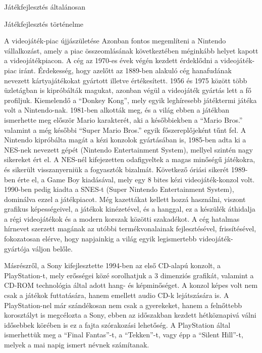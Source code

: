 \begin{MyChapter}{Játékfejlesztés általánosan}
\begin{MySection}{Játékfejlesztés történelme}
		\begin{MySubSection}{A videojáték-piac újjászületése}
			Azonban fontos megemlíteni a Nintendo vállalkozást, amely a piac összeomlásának következtében méginkább helyet kapott a videojátékpiacon. A cég az 1970-es évek végén kezdett érdeklődni a videojáték-piac iránt. Érdekesség, hogy azelőtt az 1889-ben alakuló cég hanafudának nevezett kártyajátékokat gyártott illetve értékesített. 1956 és 1975 között több üzletágban is kipróbálták magukat, azonban végül a videojáték gyártás lett a fő profiljuk. Kiemelendő a ``Donkey Kong'', mely egyik leghíresebb játéktermi játéka volt a Nintendo-nak. 1981-ben alkották meg, és a világ ebben a játékban ismerhette meg először Mario karakterét, aki a későbbiekben a ``Mario Bros.'' valamint a még későbbi ``Super Mario Bros.'' egyik főszereplőjeként tűnt fel. A Nintendo kipróbálta magát a kézi konzolok gyártásában is, 1985-ben adta ki a NES-nek nevezett gépét (Nintendo Entertainment System), mellyel szintén nagy sikereket ért el. A NES-nél kifejezetten odafigyeltek a magas minőségű játékokra, és sikerült visszanyerniük a fogyasztók bizalmát. Következő óriási sikerét 1989-ben érte el, a Game Boy kiadásával, mely egy 8 bites kézi videojáték-konzol volt. 1990-ben pedig kiadta a SNES-t (Super Nintendo Entertainment System), dominálva ezzel a játékpiacot. Még kazettákat kellett hozzá használni, viszont grafikus képességeivel, a játékok kinézetével, és a hanggal, ez a készülék áthidalja a régi videojátékok és a modern korszak közötti szakadékot. A cég hatalmas hírnevet szerzett magának az utóbbi termékvonalainak fejlesztésével, frissítésével, fokozatosan elérve, hogy napjainkig a világ egyik legismertebb videojáték-gyártója váljon belőle.
			\cite{nintendo}
					
			Másrészről, a Sony kifejlesztette 1994-ben az első CD-alapú konzolt, a PlayStation-t, mely erősségei közé sorolhatjuk a 3 dimenziós grafikát, valamint a CD-ROM technológia által adott hang- és képminőséget. A konzol képes volt nem csak a játékok futtatására, hanem emellett audio CD-k lejátszására is. A PlayStation-nel már szándékosan nem csak a gyerekeket, hanem a felnőttebb korosztályt is megcélozta a Sony, ebben az időszakban kezdett hétköznapivá válni idősebbek körében is ez a fajta szórakozási lehetőség. A PlayStation által ismerhettük meg a ``Final Fantas''-t, a ``Tekken''-t, vagy épp a ``Silent Hill''-t, melyek a mai napig ismert névnek számítanak.
			

\end{MySubSection}
\end{MySection}
\end{MyChapter}
